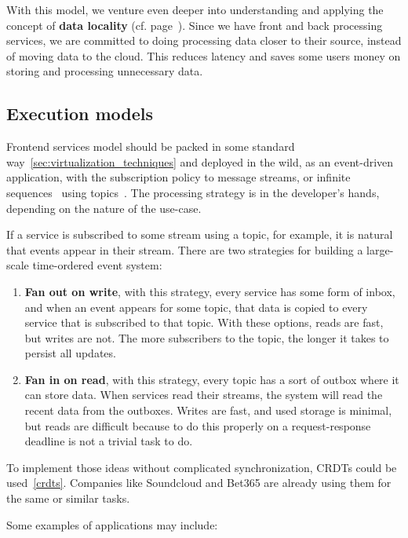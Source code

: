 With this model, we venture even deeper into understanding and applying the concept of \textbf{data locality} (cf. page~\pageref{ds:data_locality}). Since we have front and back processing services, we are committed to doing processing data closer to their source, instead of moving data to the cloud. This reduces latency and saves some users money on storing and processing unnecessary data.
%
%
\subsection{Execution models}\label{sec:execution_models}
%
Frontend services model should be packed in some standard way~\ref{sec:virtualization_techniques} and deployed in the wild, as an event-driven application, with the subscription policy to message streams, or infinite sequences~\cite{Rutten03} using topics~\cite{inproceedingsBeck}. The processing strategy is in the developer's hands, depending on the nature of the use-case. 

If a service is subscribed to some stream using a topic, for example, it is natural that events appear in their stream. There are two strategies for building a large-scale time-ordered event system:

\begin{enumerate}[start=1,label={(\bfseries \arabic*)}]
	\item \textbf{Fan out on write}, with this strategy, every service has some form of inbox, and when an event appears for some topic, that data is copied to every service that is subscribed to that topic. With these options, reads are fast, but writes are not. The more subscribers to the topic, the longer it takes to persist all updates. 
	\item \textbf{Fan in on read}, with this strategy, every topic has a sort of outbox where it can store data. When services read their streams, the system will read the recent data from the outboxes. Writes are fast, and used storage is minimal, but reads are difficult because to do this properly on a request-response deadline is not a trivial task to do.
\end{enumerate}

\noindent 
To implement those ideas without complicated synchronization, CRDTs could be used~\ref{crdts}. Companies like Soundcloud and Bet365 are already using them for the same or similar tasks.

Some examples of applications may include:

